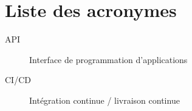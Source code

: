 \chapter*{Liste des acronymes}


\begin{description}
    \item[API] Interface de programmation d'applications
    \item[CI/CD] Intégration continue / livraison continue
\end{description}
